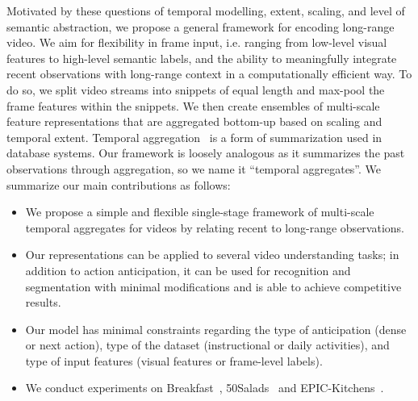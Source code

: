 \documentclass[runningheads]{llncs}
\makeatletter
\newcommand*{\ie}{i.e.\@\xspace}
\makeatother
\begin{document}
Motivated by these questions of temporal modelling, extent, scaling, and level of semantic abstraction, we propose a general framework for encoding long-range video. We aim for flexibility in frame input, \ie ranging from low-level visual features to high-level semantic labels, and the ability to meaningfully integrate recent observations with long-range context in a computationally efficient way. To do so, we split video streams into snippets of equal length and max-pool the frame features within the snippets. We then create ensembles of multi-scale feature representations that are aggregated bottom-up based on scaling and temporal extent. Temporal aggregation~\cite{kline1995computing} is a form of summarization used in database systems. Our framework is loosely analogous as it summarizes the past observations through aggregation, so we name it ``temporal aggregates''.  We summarize our main contributions as follows:
\begin{itemize}
\item We propose a simple and flexible single-stage framework of multi-scale temporal aggregates for videos by relating recent to long-range observations. 
\item Our representations can be applied to several video understanding tasks; in addition to action anticipation, it can be used for recognition and segmentation with minimal modifications and is able to achieve competitive results.
\item Our model has minimal constraints regarding the type of anticipation (dense or next action), type of the dataset (instructional or daily activities), and type of input features (visual features or frame-level labels). 
\item We conduct experiments on Breakfast~\cite{kuehne2014language}, 50Salads~\cite{stein2013combining} and EPIC-Kitchens~\cite{damen2018scaling}. 
\end{itemize}
\end{document}
